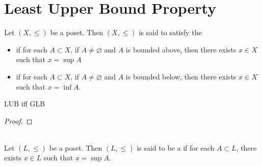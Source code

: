 \documentclass{book}
\begin{document}
	
	
	
	
	
	
	
	
	
	
	
	
	
	
	
	
	
	
	
	
	
	
	
	
	
	
	
	
	\section{Least Upper Bound Property}
	
	\begin{defn} 
		Let $(X, \leq)$ be a poset. Then $(X, \leq)$ is said to satisfy the 
		\begin{itemize}
			\item {} if for each $A \subset X$, if $A \neq \varnothing$ and $A$ is bounded above, then there exists $x \in X$ such that $x = \sup A$
			\item {} if for each $A \subset X$, if $A \neq \varnothing$ and $A$ is bounded below, then there exists $x \in X$ such that $x = \inf A$. 
		\end{itemize}
	\end{defn}
	
	\begin{ex}
		LUB iff GLB
	\end{ex}
	
	\begin{proof}
		\tcr{FINISH!!!!}
	\end{proof}
	
	\begin{defn}  \\
		Let $(L, \leq)$ be a poset. Then $(L, \leq)$ is said to be a  if for each $A \subset L$, there exists $x \in L$ such that $x = \sup A$. 
	\end{defn}
	
	
	
	
	
	
	
	
	
	
	
	
	
	
	
\end{document}
